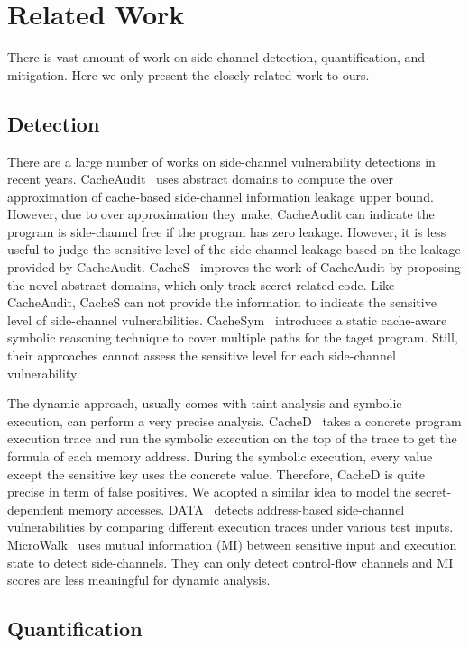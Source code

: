 \section{Related Work}

There is vast amount of work on side channel detection,
quantification, and mitigation. Here we only present the closely
related work to ours.

\subsection{Detection}

There are a large number of works on side-channel vulnerability
detections in recent years.  CacheAudit~\cite{182946} uses abstract
domains to compute the over approximation of cache-based side-channel
information leakage upper bound. However, due to over approximation they make,
CacheAudit can indicate the program is
side-channel free if the program has zero leakage.  However, it is
less useful to judge the sensitive level of the side-channel leakage
based on the leakage provided by CacheAudit. CacheS~\cite{236338}
improves the work of CacheAudit by proposing the novel abstract
domains, which only track secret-related code. Like CacheAudit, CacheS
can not provide the information to indicate the sensitive level of
side-channel vulnerabilities. CacheSym~\cite{Brotzman19Casym} introduces
a static cache-aware symbolic reasoning technique to cover multiple
paths for the taget program. Still, their approaches cannot assess
the sensitive level for each side-channel vulnerability. 

The dynamic approach, usually comes with taint analysis and symbolic
execution, can perform a very precise analysis. CacheD~\cite{203878}
takes a concrete program execution trace and run the symbolic
execution on the top of the trace to get the formula of each memory
address. During the symbolic execution, every value except the
sensitive key uses the concrete value. Therefore, CacheD is quite
precise in term of false positives. We adopted a similar idea to model
the secret-dependent memory accesses. DATA~\cite{217537} detects
address-based side-channel vulnerabilities by comparing different
execution traces under various test
inputs. MicroWalk~\cite{Wichelmann:2018:MFF:3274694.3274741} uses
mutual information (MI) between sensitive input and execution state to
detect side-channels. They can only detect control-flow channels and
MI scores are less meaningful for dynamic analysis.

\subsection{Quantification}

